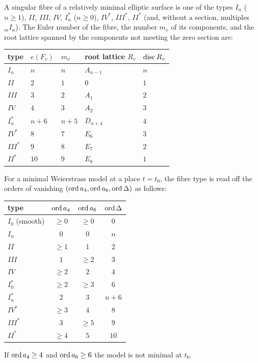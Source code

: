 \begin{theorem}\label{thm:kodaira}
A singular fibre of a relatively minimal elliptic surface is one of the types
$I_n$ ($n\ge1$), $II$, $III$, $IV$, $I_n^*$ ($n\ge0$), $IV^*$, $III^*$,
$II^*$ (and, without a section, multiples ${}_mI_n$). The Euler number of
the fibre, the number $m_v$ of its components, and the root lattice spanned
by the components not meeting the zero section are:
\begin{center}
\begin{tabular}{@{}lllll@{}}
\toprule
type & $e(F_v)$ & $m_v$ & root lattice $R_v$ & $\operatorname{disc} R_v$\\
\midrule
$I_n$ & $n$ & $n$ & $A_{n-1}$ & $n$\\
$II$ & $2$ & $1$ & $0$ & $1$\\
$III$ & $3$ & $2$ & $A_1$ & $2$\\
$IV$ & $4$ & $3$ & $A_2$ & $3$\\
$I_n^*$ & $n+6$ & $n+5$ & $D_{n+4}$ & $4$\\
$IV^*$ & $8$ & $7$ & $E_6$ & $3$\\
$III^*$ & $9$ & $8$ & $E_7$ & $2$\\
$II^*$ & $10$ & $9$ & $E_8$ & $1$\\
\bottomrule
\end{tabular}
\end{center}
\end{theorem}

\begin{theorem}\label{thm:tate}
For a minimal Weierstrass model at a place $t=t_0$, the fibre type is read off
the orders of vanishing $(\operatorname{ord} a_4,\operatorname{ord} a_6,\operatorname{ord}\Delta)$ as follows:
\begin{center}
\begin{tabular}{@{}lccc@{}}
\toprule
type & $\operatorname{ord} a_4$ & $\operatorname{ord} a_6$ & $\operatorname{ord}\Delta$\\
\midrule
$I_0$ (smooth) & $\ge0$ & $\ge0$ & $0$\\
$I_n$ & $0$ & $0$ & $n$\\
$II$ & $\ge1$ & $1$ & $2$\\
$III$ & $1$ & $\ge2$ & $3$\\
$IV$ & $\ge2$ & $2$ & $4$\\
$I_0^*$ & $\ge2$ & $\ge3$ & $6$\\
$I_n^*$ & $2$ & $3$ & $n+6$\\
$IV^*$ & $\ge3$ & $4$ & $8$\\
$III^*$ & $3$ & $\ge5$ & $9$\\
$II^*$ & $\ge4$ & $5$ & $10$\\
\bottomrule
\end{tabular}
\end{center}
If $\operatorname{ord} a_4\ge4$ and $\operatorname{ord} a_6\ge6$ the model is not minimal at $t_0$.
\end{theorem}

